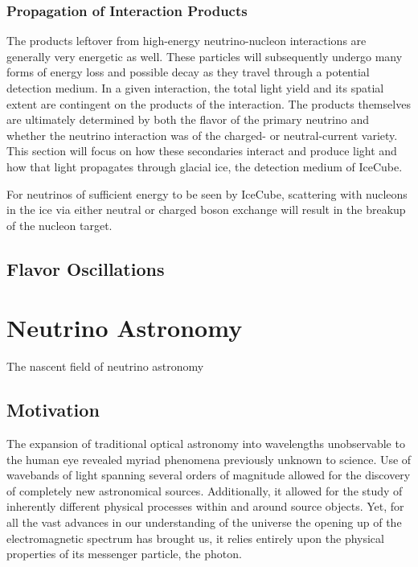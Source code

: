 \documentclass{gatech-thesis}
\begin{document}
\subsection{Propagation of Interaction Products}
The products leftover from high-energy neutrino-nucleon interactions are generally very energetic as well. These particles will subsequently undergo many forms of energy loss and possible decay as they travel through a potential detection medium. In a given interaction, the total light yield and its spatial extent are contingent on the products of the interaction. The products themselves are ultimately determined by both the flavor of the primary neutrino and whether the neutrino interaction was of the charged- or neutral-current variety. This section will focus on how these secondaries interact and produce light and how that light propagates through glacial ice, the detection medium of IceCube.

For neutrinos of sufficient energy to be seen by IceCube, scattering with nucleons in the ice via either neutral or charged boson exchange will result in the breakup of the nucleon target.
\section{Flavor Oscillations}

\chapter{Neutrino Astronomy}
The nascent field of neutrino astronomy
\section{Motivation}

The expansion of traditional optical astronomy into wavelengths unobservable to the human eye revealed myriad phenomena previously unknown to science. Use of wavebands of light spanning several orders of magnitude allowed for the discovery of completely new astronomical sources. Additionally, it allowed for the study of inherently different physical processes within and around source objects. Yet, for all the vast advances in our understanding of the universe the opening up of the electromagnetic spectrum has brought us, it relies entirely upon the physical properties of its messenger particle, the photon.
\end{document}
